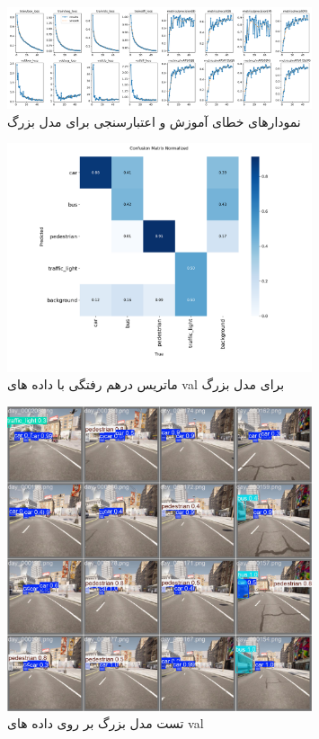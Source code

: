 \documentclass[oneside]{report}
\begin{document}
\begin{figure}[H]
  \centering
  \includegraphics[width=0.8\textwidth]{images/large/results.png}
  \caption{نمودارهای خطای آموزش و اعتبارسنجی برای مدل‌ بزرگ}
\end{figure}
\begin{figure}[H]
  \centering
  \includegraphics[width=0.8\textwidth]{images/large/confusion_matrix_normalized.png}
  \caption{ماتریس درهم رفتگی با داده های val برای مدل بزرگ}
\end{figure}
\begin{figure}[H]
  \centering
  \includegraphics[width=0.8\textwidth]{images/large/val_batch2_pred.jpg}
  \caption{تست مدل بزرگ بر روی داده های val}
\end{figure}
\end{document}
